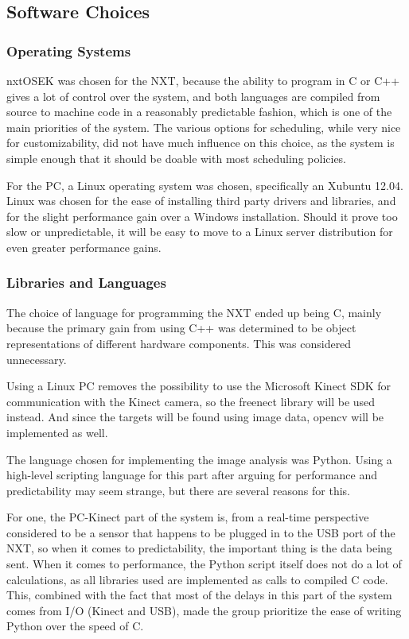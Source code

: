 \subsection{Software Choices}

\subsubsection*{Operating Systems}
nxtOSEK was chosen for the NXT, because the ability to program in C or C++ gives a lot of control over the
system, and both languages are compiled from source to machine code in a reasonably predictable fashion, which
is one of the main priorities of the system. The various options for scheduling,
while very nice for customizability, did not have much influence on this choice, as the system is simple enough
that it should be doable with most scheduling policies.

For the PC, a Linux operating system was chosen, specifically an Xubuntu 12.04. Linux was chosen for the ease
of installing third party drivers and libraries, and for the slight performance gain over a Windows installation.
Should it prove too slow or unpredictable, it will be easy to move to a Linux server distribution for even
greater performance gains. 

\subsubsection*{Libraries and Languages}
The choice of language for programming the NXT ended up being C, mainly because the primary gain from using C++ was
determined to be object representations of different hardware components. This was considered unnecessary.

Using a Linux PC removes the possibility to use the Microsoft Kinect SDK for communication with the
Kinect camera, so the freenect library will be used instead. And since the targets will be found using image
data, \ac{opencv} will be implemented as well.

The language chosen for implementing the image analysis was Python. Using a high-level scripting language for
this part after arguing for performance and predictability may seem strange, but there are several reasons for
this.

For one, the PC-Kinect part of the system is, from a real-time perspective considered to be a sensor that
happens to be plugged in to the USB port of the NXT, so when it comes to predictability, the important thing is
the data being sent.
When it comes to performance, the Python script itself does not do a lot of calculations, as all libraries used
are implemented as calls to compiled C code. This, combined with the fact that most of the delays in this part
of the system comes from I/O (Kinect and USB), made the group prioritize the ease of writing Python over the
speed of C.
